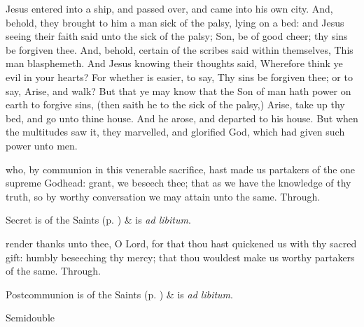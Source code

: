 
 Jesus entered into a ship, and passed over, and came into his own city. And, behold, they brought to him a man sick of the palsy, lying on a bed: and Jesus seeing their faith said unto the sick of the palsy; Son, be of good cheer; thy sins be forgiven thee. And, behold, certain of the scribes said within themselves, This man blasphemeth. And Jesus knowing their thoughts said, Wherefore think ye evil in your hearts? For whether is easier, to say, Thy sins be forgiven thee; or to say, Arise, and walk? But that ye may know that the Son of man hath power on earth to forgive sins, (then saith he to the sick of the palsy,) Arise, take up thy bed, and go unto thine house. And he arose, and departed to his house. But when the multitudes saw it, they marvelled, and glorified God, which had given such power unto men.


\secret
{} who, by communion in this venerable sacrifice, hast made us partakers of the one supreme Godhead: grant, we beseech thee; that as we have the knowledge of thy truth, so by worthy conversation we may attain unto the same. Through.
\begin{rubric}
     Secret is of the Saints (p. \pageref{SPSaints}) \&  is \emph{ad libitum}.
\end{rubric}


\postcommunion
{} render thanks unto thee, O Lord, for that thou hast quickened us with thy sacred gift: humbly beseeching thy mercy; that thou wouldest make us worthy partakers of the same. Through.
\begin{rubric}
     Postcommunion is of the Saints (p. \pageref{SPSaints}) \&  is \emph{ad libitum}.
\end{rubric}

\begin{inhead}
{Semidouble}
\end{inhead}

